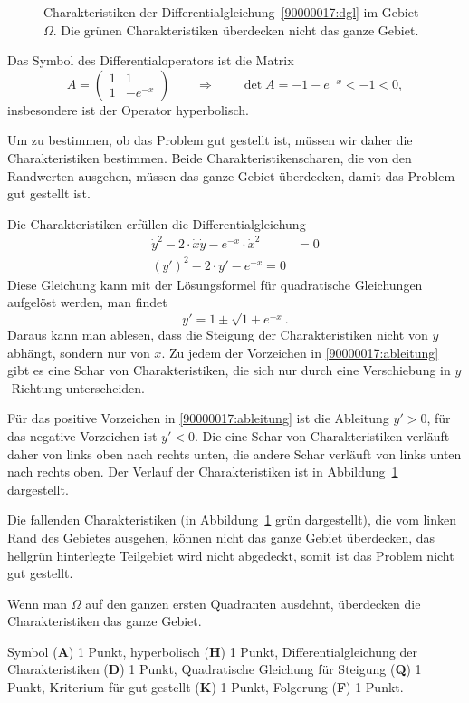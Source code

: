 \begin{loesung}
\begin{figure}
\centering
{}
\caption{Charakteristiken der Differentialgleichung~\eqref{90000017:dgl}
im Gebiet $\Omega$.
Die grünen Charakteristiken überdecken nicht das ganze Gebiet.
\label{90000017:char}}
\end{figure}
Das Symbol des Differentialoperators  ist die Matrix
\[
A
=
\begin{pmatrix} 1 & 1\\ 1 & -e^{-x} \end{pmatrix}
\qquad\Rightarrow\qquad
\det A
=
-1 -e^{-x} < -1 < 0,
\]
insbesondere ist der Operator hyperbolisch.

Um zu bestimmen, ob das Problem gut gestellt ist, müssen wir daher die
Charakteristiken bestimmen.
Beide Charakteristikenscharen, die von den Randwerten ausgehen, müssen das
ganze Gebiet überdecken, damit das Problem gut gestellt ist.

Die Charakteristiken erfüllen die Differentialgleichung
\begin{align*}
\dot y^2
-
2 \cdot \dot x \dot y
-
e^{-x}\cdot \dot x^2
&=
0
\\
(y')^2
-2\cdot y'
-e^{-x} 
=
0
\end{align*}
Diese Gleichung kann mit der Lösungsformel für quadratische Gleichungen
aufgelöst werden, man findet
\begin{equation}
y' = 1 \pm \sqrt{1+e^{-x}}.
\label{90000017:ableitung}
\end{equation}
Daraus kann man ablesen, dass die Steigung der Charakteristiken nicht von
$y$ abhängt, sondern nur von $x$.
Zu jedem der Vorzeichen in \eqref{90000017:ableitung} gibt es eine Schar
von Charakteristiken, die sich nur durch eine Verschiebung in $y$-Richtung
unterscheiden.

Für das positive Vorzeichen in \eqref{90000017:ableitung} ist die
Ableitung $y' > 0$, für das negative Vorzeichen ist $y'<0$.
Die eine Schar von Charakteristiken verläuft daher von links oben
nach rechts unten, die andere Schar verläuft von links unten nach
rechts oben.
Der Verlauf der Charakteristiken ist in Abbildung~\ref{90000017:char}
dargestellt.

Die fallenden Charakteristiken (in Abbildung~\ref{90000017:char} grün
dargestellt), die vom linken Rand des Gebietes
ausgehen, können nicht das ganze Gebiet überdecken, das hellgrün
hinterlegte Teilgebiet wird nicht abgedeckt, somit ist das
Problem nicht gut gestellt.
\end{loesung}

\begin{diskussion}
Wenn man $\Omega$ auf den ganzen ersten Quadranten ausdehnt, überdecken
die Charakteristiken das ganze Gebiet.
\end{diskussion}

\begin{bewertung}
Symbol ({\bf A}) 1 Punkt,
hyperbolisch ({\bf H}) 1 Punkt,
Differentialgleichung der Charakteristiken ({\bf D}) 1 Punkt,
Quadratische Gleichung für Steigung ({\bf Q}) 1 Punkt,
Kriterium für gut gestellt ({\bf K}) 1 Punkt,
Folgerung ({\bf F}) 1 Punkt.
\end{bewertung}

